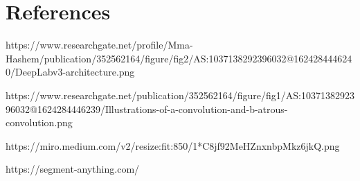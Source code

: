 \section{References}

\begin{thebibliography}{00}

    
 https://www.researchgate.net/profile/Mma-Hashem/publication/352562164/figure/fig2/AS:1037138292396032@1624284446240/DeepLabv3-architecture.png

 https://www.researchgate.net/publication/352562164/figure/fig1/AS:1037138292396032@1624284446239/Illustrations-of-a-convolution-and-b-atrous-convolution.png
    
 https://miro.medium.com/v2/resize:fit:850/1*C8jf92MeHZnxnbpMkz6jkQ.png

 https://segment-anything.com/

\end{thebibliography}